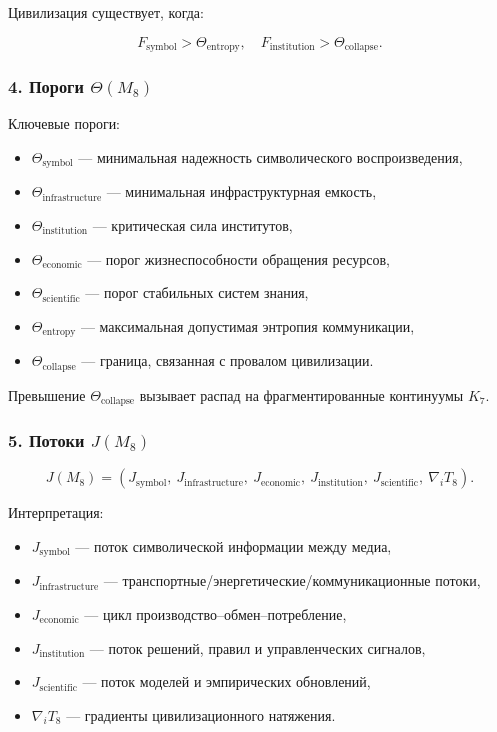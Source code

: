 Цивилизация существует, когда:

\[
F_{\mathrm{symbol}} > \Theta_{\mathrm{entropy}},
\quad
F_{\mathrm{institution}} > \Theta_{\mathrm{collapse}}.
\]

\subsubsection*{4. Пороги \texorpdfstring{$\Theta(M_8)$}{\Theta(M_8)}}

Ключевые пороги:

\begin{itemize}
    \item $\Theta_{\mathrm{symbol}}$ — минимальная надежность символического воспроизведения,
    \item $\Theta_{\mathrm{infrastructure}}$ — минимальная инфраструктурная емкость,
    \item $\Theta_{\mathrm{institution}}$ — критическая сила институтов,
    \item $\Theta_{\mathrm{economic}}$ — порог жизнеспособности обращения ресурсов,
    \item $\Theta_{\mathrm{scientific}}$ — порог стабильных систем знания,
    \item $\Theta_{\mathrm{entropy}}$ — максимальная допустимая энтропия коммуникации,
    \item $\Theta_{\mathrm{collapse}}$ — граница, связанная с провалом цивилизации.
\end{itemize}

Превышение $\Theta_{\mathrm{collapse}}$ вызывает распад на фрагментированные континуумы $K_7$.

\subsubsection*{5. Потоки \texorpdfstring{$J(M_8)$}{J(M_8)}}

\[
J(M_8)=
(J_{\mathrm{symbol}},\
J_{\mathrm{infrastructure}},\
J_{\mathrm{economic}},\
J_{\mathrm{institution}},\
J_{\mathrm{scientific}},\
\nabla_i T_8).
\]

Интерпретация:

\begin{itemize}
    \item $J_{\mathrm{symbol}}$ — поток символической информации между медиа,
    \item $J_{\mathrm{infrastructure}}$ — транспортные/энергетические/коммуникационные потоки,
    \item $J_{\mathrm{economic}}$ — цикл производство–обмен–потребление,
    \item $J_{\mathrm{institution}}$ — поток решений, правил и управленческих сигналов,
    \item $J_{\mathrm{scientific}}$ — поток моделей и эмпирических обновлений,
    \item $\nabla_i T_8$ — градиенты цивилизационного натяжения.
\end{itemize}

